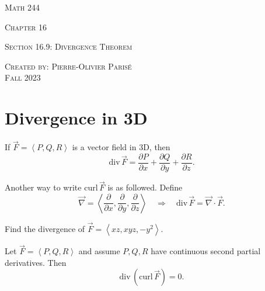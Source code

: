 \documentclass[20pt,a4paper]{extarticle}
\newcommand{\curl}{\mathrm{curl} \,}
\renewcommand{\div}{\mathrm{div}\,}
\newcounter{example}[section]
\newcounter{theorem}
\newcounter{definition}
\begin{document}
\thispagestyle{empty}

\begin{center}
\vspace*{2.5cm}

{\Huge \textsc{Math 244}}

\vspace*{2cm}

{\LARGE \textsc{Chapter 16}} 

\vspace*{0.75cm}

\noindent\textsc{Section 16.9: Divergence Theorem}

\vspace*{0.75cm}

\tableofcontents

\vfill

\noindent \textsc{Created by: Pierre-Olivier Paris{\'e}} \\
\textsc{Fall 2023}
\end{center}

\newpage

\section{Divergence in 3D}

\begin{definition}
If $\vec{F} = \left\langle P, Q, R \right\rangle$ is a vector field in 3D, then
	\[
		\div \vec{F} = \frac{\partial P}{\partial x} + \frac{\partial Q}{\partial y} + \frac{\partial R}{\partial z} .
	\]
\end{definition}

Another way to write $\curl \vec{F}$ is as followed. Define
	\[
		\vec{\nabla} = \left\langle \frac{\partial}{\partial x} , \frac{\partial}{\partial y} , \frac{\partial}{\partial z} \right\rangle \quad \Longrightarrow \quad \div \vec{F} = \vec{\nabla} \cdot \vec{F} .
	\]

\begin{example}
Find the divergence of $\vec{F} = \left\langle xz , xyz , -y^2 \right\rangle$.
\end{example}

\begin{notes}

\end{notes}

\newpage 

\begin{theorem}
Let $\vec{F} = \left\langle P , Q, R \right\rangle$ and assume $P, Q, R$ have continuous second partial derivatives. Then 
	$$
	\div (\curl \vec{F}) = 0 .
	$$
\end{theorem}
\end{document}
